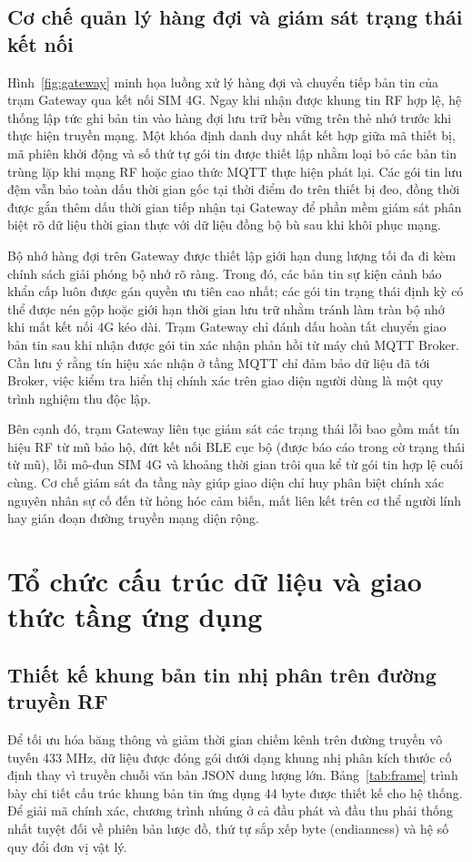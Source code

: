 \subsection{Cơ chế quản lý hàng đợi và giám sát trạng thái kết nối}
Hình~\ref{fig:gateway} minh họa luồng xử lý hàng đợi và chuyển tiếp bản tin của trạm Gateway qua kết nối SIM 4G. Ngay khi nhận được khung tin RF hợp lệ, hệ thống lập tức ghi bản tin vào hàng đợi lưu trữ bền vững trên thẻ nhớ trước khi thực hiện truyền mạng. Một khóa định danh duy nhất kết hợp giữa mã thiết bị, mã phiên khởi động và số thứ tự gói tin được thiết lập nhằm loại bỏ các bản tin trùng lặp khi mạng RF hoặc giao thức MQTT thực hiện phát lại. Các gói tin lưu đệm vẫn bảo toàn dấu thời gian gốc tại thời điểm đo trên thiết bị đeo, đồng thời được gắn thêm dấu thời gian tiếp nhận tại Gateway để phần mềm giám sát phân biệt rõ dữ liệu thời gian thực với dữ liệu đồng bộ bù sau khi khôi phục mạng.


Bộ nhớ hàng đợi trên Gateway được thiết lập giới hạn dung lượng tối đa đi kèm chính sách giải phóng bộ nhớ rõ ràng. Trong đó, các bản tin sự kiện cảnh báo khẩn cấp luôn được gán quyền ưu tiên cao nhất; các gói tin trạng thái định kỳ có thể được nén gộp hoặc giới hạn thời gian lưu trữ nhằm tránh làm tràn bộ nhớ khi mất kết nối 4G kéo dài. Trạm Gateway chỉ đánh dấu hoàn tất chuyển giao bản tin sau khi nhận được gói tin xác nhận phản hồi từ máy chủ MQTT Broker. Cần lưu ý rằng tín hiệu xác nhận ở tầng MQTT chỉ đảm bảo dữ liệu đã tới Broker, việc kiểm tra hiển thị chính xác trên giao diện người dùng là một quy trình nghiệm thu độc lập.

Bên cạnh đó, trạm Gateway liên tục giám sát các trạng thái lỗi bao gồm mất tín hiệu RF từ mũ bảo hộ, đứt kết nối BLE cục bộ (được báo cáo trong cờ trạng thái từ mũ), lỗi mô-đun SIM 4G và khoảng thời gian trôi qua kể từ gói tin hợp lệ cuối cùng. Cơ chế giám sát đa tầng này giúp giao diện chỉ huy phân biệt chính xác nguyên nhân sự cố đến từ hỏng hóc cảm biến, mất liên kết trên cơ thể người lính hay gián đoạn đường truyền mạng diện rộng.

\section{Tổ chức cấu trúc dữ liệu và giao thức tầng ứng dụng}\label{sec:data}
\subsection{Thiết kế khung bản tin nhị phân trên đường truyền RF}
Để tối ưu hóa băng thông và giảm thời gian chiếm kênh trên đường truyền vô tuyến 433 MHz, dữ liệu được đóng gói dưới dạng khung nhị phân kích thước cố định thay vì truyền chuỗi văn bản JSON dung lượng lớn. Bảng~\ref{tab:frame} trình bày chi tiết cấu trúc khung bản tin ứng dụng 44 byte được thiết kế cho hệ thống. Để giải mã chính xác, chương trình nhúng ở cả đầu phát và đầu thu phải thống nhất tuyệt đối về phiên bản lược đồ, thứ tự sắp xếp byte (endianness) và hệ số quy đổi đơn vị vật lý.

